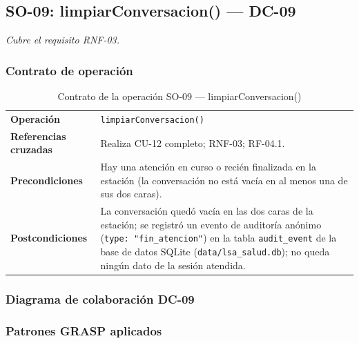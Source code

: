 \subsection{SO-09: limpiarConversacion() --- DC-09}
\textit{Cubre el requisito RNF-03.}

\subsubsection{Contrato de operación}

\begin{table}[H]
\centering
\begin{tabularx}{\textwidth}{@{}p{4.4cm} X@{}}
\toprule
\textbf{Operación} & \texttt{limpiarConversacion()} \\
\textbf{Referencias cruzadas} & Realiza CU-12 completo; RNF-03;
RF-04.1. \\
\textbf{Precondiciones} & Hay una atención en curso o recién finalizada en
la estación (la conversación no está vacía en al menos una de sus dos
caras). \\
\textbf{Postcondiciones} & La conversación quedó vacía en las dos caras de
la estación; se registró un evento de auditoría anónimo
(\texttt{type: "fin\_atencion"}) en la tabla \texttt{audit\_event} de la
base de datos SQLite (\texttt{data/lsa\_salud.db}); no queda ningún dato de
la sesión atendida. \\
\bottomrule
\end{tabularx}
\caption{Contrato de la operación SO-09 --- limpiarConversacion()}
\label{tab:col-contrato-so09}
\end{table}

\subsubsection{Diagrama de colaboración DC-09}


\subsubsection{Patrones GRASP aplicados}

